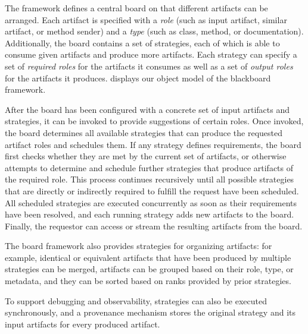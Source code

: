 The framework defines a central board on that different artifacts can be arranged.
Each artifact is specified with a \emph{role} (such as input artifact, similar artifact, or method sender) and a \emph{type} (such as class, method, or documentation).
Additionally, the board contains a set of strategies, each of which is able to consume given artifacts and produce more artifacts.
Each strategy can specify a set of \emph{required roles} for the artifacts it consumes as well as a set of \emph{output roles} for the artifacts it produces.
 displays our object model of the blackboard framework.

After the board has been configured with a concrete set of input artifacts and strategies, it can be invoked to provide suggestions of certain roles.
Once invoked, the board determines all available strategies that can produce the requested artifact roles and schedules them.
If any strategy defines requirements, the board first checks whether they are met by the current set of artifacts, or otherwise attempts to determine and schedule further strategies that produce artifacts of the required role.
This process continues recursively until all possible strategies that are directly or indirectly required to fulfill the request have been scheduled.
All scheduled strategies are executed concurrently as soon as their requirements have been resolved, and each running strategy adds new artifacts to the board.
Finally, the requestor can access or stream the resulting artifacts from the board.

The board framework also provides strategies for organizing artifacts:
for example, identical or equivalent artifacts that have been produced by multiple strategies can be merged, artifacts can be grouped based on their role, type, or metadata, and they can be sorted based on ranks provided by prior strategies.

To support debugging and observability, strategies can also be executed synchronously, and a provenance mechanism stores the original strategy and its input artifacts for every produced artifact.

